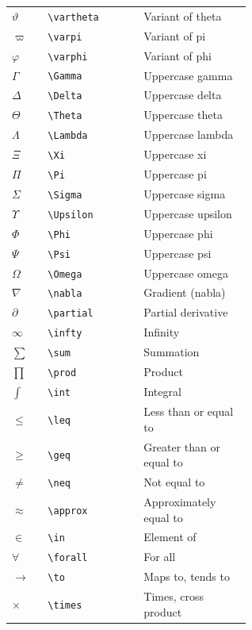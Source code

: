 \begin{longtable}{>{\centering\arraybackslash}p{0.15\linewidth}l>{\raggedright\arraybackslash}p{0.45\linewidth}}
$\vartheta$ & \verb+\vartheta+ & Variant of theta \\
$\varpi$ & \verb+\varpi+ & Variant of pi \\
$\varphi$ & \verb+\varphi+ & Variant of phi \\
$\Gamma$ & \verb+\Gamma+ & Uppercase gamma \\
$\Delta$ & \verb+\Delta+ & Uppercase delta \\
$\Theta$ & \verb+\Theta+ & Uppercase theta \\
$\Lambda$ & \verb+\Lambda+ & Uppercase lambda \\
$\Xi$ & \verb+\Xi+ & Uppercase xi \\
$\Pi$ & \verb+\Pi+ & Uppercase pi \\
$\Sigma$ & \verb+\Sigma+ & Uppercase sigma \\
$\Upsilon$ & \verb+\Upsilon+ & Uppercase upsilon \\
$\Phi$ & \verb+\Phi+ & Uppercase phi \\
$\Psi$ & \verb+\Psi+ & Uppercase psi \\
$\Omega$ & \verb+\Omega+ & Uppercase omega \\
$\nabla$ & \verb+\nabla+ & Gradient (nabla) \\
$\partial$ & \verb+\partial+ & Partial derivative \\
$\infty$ & \verb+\infty+ & Infinity \\
$\sum$ & \verb+\sum+ & Summation \\
$\prod$ & \verb+\prod+ & Product \\
$\int$ & \verb+\int+ & Integral \\
$\leq$ & \verb+\leq+ & Less than or equal to \\
$\geq$ & \verb+\geq+ & Greater than or equal to \\
$\neq$ & \verb+\neq+ & Not equal to \\
$\approx$ & \verb+\approx+ & Approximately equal to \\
$\in$ & \verb+\in+ & Element of \\
$\forall$ & \verb+\forall+ & For all \\
$\to$ & \verb+\to+ & Maps to, tends to \\
$\times$ & \verb+\times+ & Times, cross product \\
\end{longtable}
